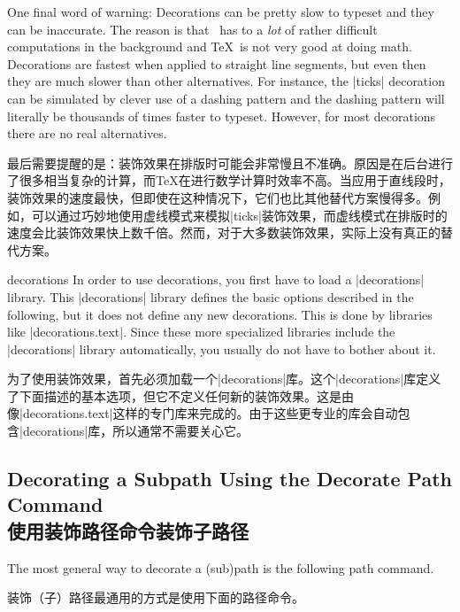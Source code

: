 One final word of warning: Decorations can be pretty slow to typeset and they
can be inaccurate. The reason is that \pgfname\ has to a \emph{lot} of rather
difficult computations in the background and \TeX\ is not very good at doing
math. Decorations are fastest when applied to straight line segments, but even
then they are much slower than other alternatives. For instance, the |ticks|
decoration can be simulated by clever use of a dashing pattern and the dashing
pattern will literally be thousands of times faster to typeset. However, for
most decorations there are no real alternatives.

最后需要提醒的是：装饰效果在排版时可能会非常慢且不准确。原因是\pgfname 在后台进行了很多相当复杂的计算，而\TeX 在进行数学计算时效率不高。当应用于直线段时，装饰效果的速度最快，但即使在这种情况下，它们也比其他替代方案慢得多。例如，可以通过巧妙地使用虚线模式来模拟|ticks|装饰效果，而虚线模式在排版时的速度会比装饰效果快上数千倍。然而，对于大多数装饰效果，实际上没有真正的替代方案。

\begin{tikzlibrary}{decorations}
    In order to use decorations, you first have to load a |decorations| library.
    This |decorations| library defines the basic options described in the
    following, but it does not define any new decorations. This is done by
    libraries like |decorations.text|. Since these more specialized libraries
    include the |decorations| library automatically, you usually do not have to
    bother about it.

    为了使用装饰效果，首先必须加载一个|decorations|库。这个|decorations|库定义了下面描述的基本选项，但它不定义任何新的装饰效果。这是由像|decorations.text|这样的专门库来完成的。由于这些更专业的库会自动包含|decorations|库，所以通常不需要关心它。

  \end{tikzlibrary}


\subsection{Decorating a Subpath Using the Decorate Path Command\\使用装饰路径命令装饰子路径}

The most general way to decorate a (sub)path is the following path command.

装饰（子）路径最通用的方式是使用下面的路径命令。

